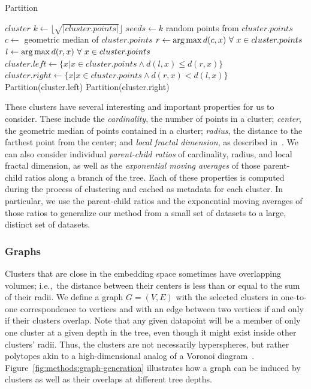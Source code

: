 \begin{algorithm} %
\caption{Partition} %
\label{alg:clam-partition} %
\begin{algorithmic}[1] %
    \REQUIRE $cluster$
    \STATE $k \leftarrow \lfloor \sqrt{|cluster.points|} \rfloor$
    \STATE $seeds \leftarrow k$ random points from $cluster.points$
    \STATE $c \leftarrow$ geometric median of $cluster.points$
    \STATE $r \leftarrow \operatorname*{arg\,max} d(c,x) \ \forall \ x \in cluster.points$
    \STATE $l \leftarrow \operatorname*{arg\,max} d(r,x) \ \forall \ x \in cluster.points$
    \STATE $cluster.left \leftarrow \{x | x \in cluster.points \land d(l,x) \le d(r,x)\}$
    \STATE $cluster.right \leftarrow \{x | x \in cluster.points \land d(r,x) < d(l,x)\}$
        \STATE Partition(cluster.left)
    \ENDIF
        \STATE Partition(cluster.right)
    \ENDIF
\end{algorithmic}
\end{algorithm}

These clusters have several interesting and important properties for us to consider.
These include the \textit{cardinality}, the number of points in a cluster;
\textit{center}, the geometric median of points contained in a cluster;
\textit{radius}, the distance to the farthest point from the center;
and \textit{local fractal dimension}, as described in~\cite{ishaq2019clustered}.
We can also consider individual \textit{parent-child ratios} of cardinality, radius, and local fractal dimension, as well as the \textit{exponential moving averages} of those parent-child ratios along a branch of the tree.
Each of these properties is computed during the process of clustering and cached as metadata for each cluster.
In particular, we use the parent-child ratios and the exponential moving averages of those ratios to generalize our method from a small set of datasets to a large, distinct set of datasets.

\subsubsection{Graphs}
Clusters that are close in the embedding space sometimes have overlapping volumes; i.e.,\ the distance between their centers is less than or equal to the sum of their radii.
We define a graph $G=(V,E)$ with the selected clusters in one-to-one correspondence to vertices and with an edge between two vertices if and only if their clusters overlap.
Note that any given datapoint will be a member of only one cluster at a given depth in the tree, even though it might exist inside other clusters' radii.
Thus, the clusters are not necessarily hyperspheres, but rather polytopes akin to a high-dimensional analog of a Voronoi diagram~\cite{voronoi1908nouvelles}.
Figure~\ref{fig:methods:graph-generation} illustrates how a graph can be induced by clusters as well as their overlaps at different tree depths.

